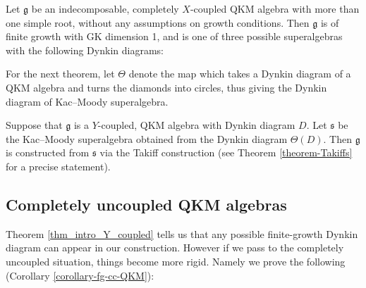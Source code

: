 \documentclass[12pt, a4paper, reqno]{amsart}
\def\q{\mathfrak{q}}
\def\g{\mathfrak{g}}
\def\s{\mathfrak{s}}
\theoremstyle{definition}
\theoremstyle{definition}
\theoremstyle{definition}
\numberwithin{theorem}{section}
\numberwithin{lemma}{section}
\numberwithin{remark}{section}
\numberwithin{definition}{section}
\numberwithin{corollary}{section}
\numberwithin{proposition}{section}
\numberwithin{example}{section}
\begin{document}
	\begin{theorem}\label{thm intro type X}
		Let $\g$ be an indecomposable, completely $X$-coupled QKM algebra with more than one simple root, without any assumptions on growth conditions.  Then $\g$ is of finite growth with GK dimension 1, and is one of three possible superalgebras with the following Dynkin diagrams:
		\begin{center}
		\end{center}
		\begin{center}
		\end{center}
		\begin{center}
		\end{center}
	\end{theorem}

For the next theorem, let $\Theta$ denote the map which takes a Dynkin diagram of a QKM algebra and turns the diamonds into circles, thus giving the Dynkin diagram of Kac--Moody superalgebra.
	
	\begin{theorem}\label{thm_intro_Y_coupled}
		Suppose that $\g$ is a $Y$-coupled, QKM algebra with Dynkin diagram $D$.   Let $\s$ be the Kac--Moody superalgebra obtained from the Dynkin diagram $\Theta(D)$. Then $\g$ is constructed from $\s$ via the Takiff construction (see Theorem \ref{theorem-Takiffs} for a precise statement).
	\end{theorem}
	
	\subsection{Completely uncoupled QKM algebras} Theorem \ref{thm_intro_Y_coupled} tells us that any possible finite-growth Dynkin diagram can appear in our construction.  However if we pass to the completely uncoupled situation, things become more rigid.  Namely we prove the following (Corollary \ref{corollary-fg-cc-QKM}):
	
\end{document}
